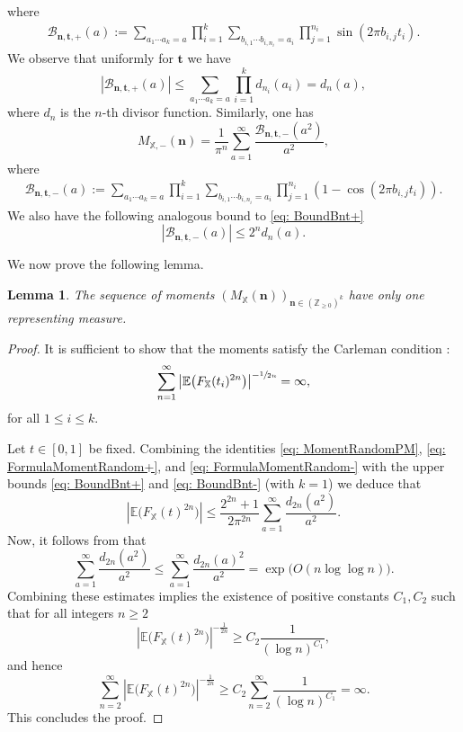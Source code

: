 \documentclass[10pt]{amsart}
\theoremstyle{plain}
\newtheorem{lem}[thm]{Lemma}
\theoremstyle{definition}
\newcommand{\X}{\mathbb{X}}
\newcommand{\ex}{\mathbb{E}}
\begin{document}
where
\begin{align*}
\mathcal{B}_{\boldsymbol{n},\mathbf{t},+}(a)
:= \sum_{a_{1}\cdots a_{k} = a} \prod_{i = 1}^k \sum_{b_{i,1} \cdots b_{i,n_i} = a_i } \prod_{j = 1}^{n_i} \sin(2 \pi b_{i,j} t_i).
\end{align*}
We observe that uniformly for $\mathbf{t}$ we have
\begin{equation}\label{eq: BoundBnt+}
|\mathcal{B}_{\boldsymbol{n},\mathbf{t}, +}(a)| \leq \sum_{a_1 \cdots a_k = a} \prod_{i = 1}^k d_{n_i}(a_i) = d_n (a),
\end{equation}
where $d_n$ is the $n$-th divisor function.
Similarly, one has
\begin{equation}\label{eq: FormulaMomentRandom-}
M_{\X,-}(\boldsymbol{n})= \frac{1}{\pi^{n}} \sum_{a=1}^{\infty} \frac{\mathcal{B}_{\boldsymbol{n},\mathbf{t}, -}(a^2)}{a^2},
\end{equation}
where \begin{align*}
\mathcal{B}_{\boldsymbol{n},\mathbf{t},-}(a)
:= \sum_{a_{1}\cdots a_{k} = a} \prod_{i = 1}^k \sum_{b_{i,1}\cdots b_{i,n_i} = a_i } \prod_{j = 1}^{n_i} (1-\cos(2 \pi b_{i,j} t_i)).
\end{align*}
We also have the following analogous bound to \eqref{eq: BoundBnt+}
\begin{equation}\label{eq: BoundBnt-}|\mathcal{B}_{\boldsymbol{n},\mathbf{t}, -}(a)|\leq 2^nd_n(a).
\end{equation}

We now prove the following lemma.
\begin{lem}
The sequence of moments $(M_{\X}(\boldsymbol{n}))_{\boldsymbol{n}\in (\mathbb{Z}_{\geq 0})^k}$ have only one representing measure.\end{lem}

\begin{proof}
It is sufficient to show that the moments satisfy the Carleman condition \cite[Th.\,15.11]{Sc}:
\begin{align}\label{eq: carleman condition}
\sum_{n = 1}^\infty \left|\ex\big(F_{\X}(t_i)^{2n}\big)\right|^{-\sfrac{1}{2n}} = \infty,
\end{align}
for all $1\leq i\leq k$.

Let $t\in [0, 1]$ be fixed. Combining the identities \eqref{eq: MomentRandomPM}, \eqref{eq: FormulaMomentRandom+}, and \eqref{eq: FormulaMomentRandom-} with the upper bounds \eqref{eq: BoundBnt+} and \eqref{eq: BoundBnt-} (with $k=1$) we deduce that
\[
\left|\ex\big(F_{\X}(t)^{2n}\big)\right| \leq \frac{2^{2n}+1}{2\pi^{2n}} \sum_{a=1}^{\infty}\frac{d_{2n}(a^2)}{a^2}.
\]
Now, it follows from \cite[Lem.\,3.3]{La2} that
\[\sum_{a=1}^{\infty}\frac{d_{2n}(a^2)}{a^2} \leq \sum_{a=1}^{\infty}\frac{d_{2n}(a)^2}{a^2}= \exp\big(O(n\log\log n)\big).\]
Combining these estimates implies the existence of positive constants $C_1, C_2$ such that for all integers $n\geq 2$
\[
\left|\ex\big(F_{\X}(t)^{2n}\big)\right|^{-\frac{1}{2n}} \geq C_2 \frac{1}{(\log n)^{C_1}},\]
and hence
\[
\sum_{n=2}^{\infty}\left|\ex\big(F_{\X}(t)^{2n}\big)\right|^{-\frac{1}{2n}}\geq C_2 \sum_{n=2}^{\infty}\frac{1}{(\log n)^{C_1}}= \infty.\]
This concludes the proof.
\end{proof}
\end{document}
